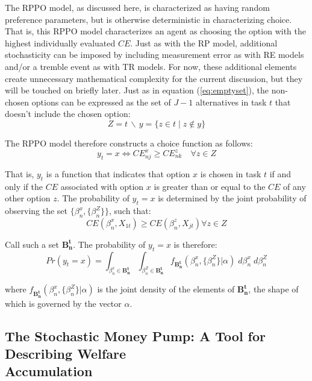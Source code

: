 \documentclass[11pt,a4paper]{article}
\newcommand\CE{\ensuremath{\mathit{CE}}}  %
\newcommand\Prob{\ensuremath{\mathit{Pr}}}  %
\begin{document}
The RPPO model, as discussed here, is characterized as having random preference parameters, but is otherwise deterministic in characterizing choice.
That is, this RPPO model characterizes an agent as choosing the option with the highest individually evaluated {\CE}.
Just as with the RP model, additional stochasticity can be imposed by including measurement error as with RE models and/or a tremble event as with TR models.
For now, these additional elements create unnecessary mathematical complexity for the current discussion, but they will be touched on briefly later.
Just as in equation (\ref{eq:emptyset}), the non-chosen options can be expressed as the set of $J-1$ alternatives in task $t$ that doesn't include the chosen option:
\begin{equation}
	\label{eq:RPPO:emptyset}
	Z = t \,\backslash\, y = \{z \in t \;|\; z \notin y \}
\end{equation}


\noindent The RPPO model therefore constructs a choice function as follows:
\begin{equation}
	\label{RPPO.y0}
	y_t = x \Leftrightarrow {\CE}_{nj}^x \geq {\CE}_{nk}^z \quad \forall z \in Z
\end{equation}

That is, $y_t$ is a function that indicates that option $x$ is chosen in task $t$ if and only if the {\CE} associated with option $x$ is greater than or equal to the {\CE} of any other option $z$.
The probability of $y_t = x$ is determined by the joint probability of observing the set $\bigl\{\beta_n^x,\{\beta_n^Z\}\bigr\}$, such that:
\begin{equation}
	\label{eq:RPPO.y1}
	{\CE}(\beta_n^x,X_{1t}) \geq {\CE}(\beta_n^z,X_{jt}) \forall z \in Z
\end{equation}

\noindent Call such a set $\mathbf{B^t_n}$.
The probability of $y_t=x$ is therefore:
\begin{equation}
	{\Prob}(y_t=x) = \int_{\beta_n^x \in \mathbf{B^t_n}}\int_{\beta_n^Z \in \mathbf{B^t_n}} f_{\mathbf{B^t_n}}\!\left(\beta_n^x,\{\beta_n^Z\}|\alpha\right) \;d\beta_n^x \; d\beta_n^Z
\end{equation}

\noindent where $f_{\mathbf{B^t_n}}(\beta_n^x,\{\beta_n^Z\}|\alpha)$ is the joint density of the elements of $\mathbf{B^t_n}$, the shape of which is governed by the vector $\alpha$.

\subsection[The Stochastic Money Pump: A Tool for Describing Welfare \texorpdfstring{\\}{}Accumulation]{The Stochastic Money Pump: A Tool for Describing Welfare\\Accumulation}
\end{document}
